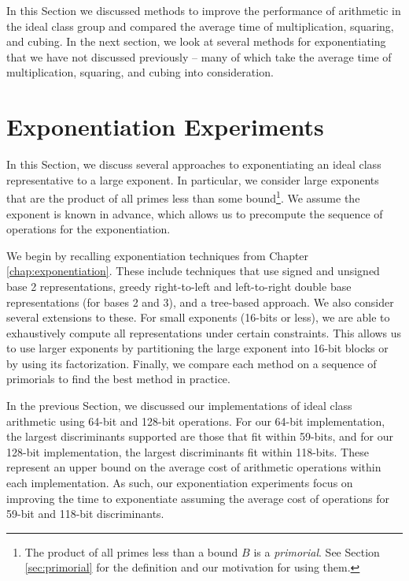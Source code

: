 \documentclass{ucalgthes1}
\theoremstyle{definition}
\begin{document}
In this Section we discussed methods to improve the performance of arithmetic in the ideal class group and compared the average time of multiplication, squaring, and cubing.  In the next section, we look at several methods for exponentiating that we have not discussed previously -- many of which take the average time of multiplication, squaring, and cubing into consideration.

\bigbreak
\section{Exponentiation Experiments}
\label{sec:exponentiation}


In this Section, we discuss several approaches to exponentiating an ideal class representative to a large exponent.  In particular, we consider large exponents that are the product of all primes less than some bound\footnote{The product of all primes less than a bound $B$ is a \emph{primorial}.  See Section \ref{sec:primorial} for the definition and our motivation for using them.}.  We assume the exponent is known in advance, which allows us to precompute the sequence of operations for the exponentiation.

We begin by recalling exponentiation techniques from Chapter \ref{chap:exponentiation}.  These include techniques that use signed and unsigned base 2 representations, greedy right-to-left and left-to-right double base representations (for bases 2 and 3), and a tree-based approach. We also consider several extensions to these.  For small exponents (16-bits or less), we are able to exhaustively compute all representations under certain constraints.  This allows us to use larger exponents by partitioning the large exponent into 16-bit blocks or by using its factorization. Finally, we compare each method on a sequence of primorials to find the best method in practice.

In the previous Section, we discussed our implementations of ideal class arithmetic using 64-bit and 128-bit operations.  For our 64-bit implementation, the largest discriminants supported are those that fit within 59-bits, and for our 128-bit implementation, the largest discriminants fit within 118-bits.  These represent an upper bound on the average cost of arithmetic operations within each implementation. As such, our exponentiation experiments focus on improving the time to exponentiate assuming the average cost of operations for 59-bit and 118-bit discriminants.
\end{document}
